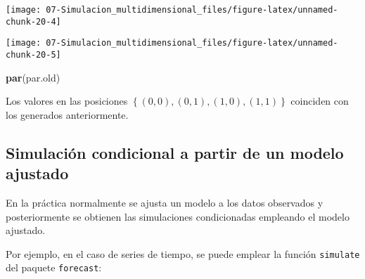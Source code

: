 \documentclass[
]{book}
\newenvironment{Shaded}{\begin{snugshade}}{\end{snugshade}}
\newcommand{\DataTypeTok}[1]{\textcolor[rgb]{0.13,0.29,0.53}{#1}}
\newcommand{\DecValTok}[1]{\textcolor[rgb]{0.00,0.00,0.81}{#1}}
\newcommand{\KeywordTok}[1]{\textcolor[rgb]{0.13,0.29,0.53}{\textbf{#1}}}
\newcommand{\NormalTok}[1]{#1}
\newcommand{\OperatorTok}[1]{\textcolor[rgb]{0.81,0.36,0.00}{\textbf{#1}}}
\newcommand{\StringTok}[1]{\textcolor[rgb]{0.31,0.60,0.02}{#1}}
\theoremstyle{break}
\theoremstyle{definition}
\theoremstyle{definition}
\theoremstyle{definition}
\theoremstyle{remark}
\begin{document}
\begin{center}\texttt{[image: 07-Simulacion\_multidimensional\_files/figure-latex/unnamed-chunk-20-4]} \end{center}

\begin{Shaded}
\end{Shaded}

\begin{center}\texttt{[image: 07-Simulacion\_multidimensional\_files/figure-latex/unnamed-chunk-20-5]} \end{center}

\begin{Shaded}
\begin{Highlighting}[]
\KeywordTok{par}\NormalTok{(par.old)}
\end{Highlighting}
\end{Shaded}

Los valores en las posiciones \(\left\{(0,0),(0,1),(1,0),(1,1)\right\}\)
coinciden con los generados anteriormente.

\hypertarget{simulaciuxf3n-condicional-a-partir-de-un-modelo-ajustado}{%
\subsection{Simulación condicional a partir de un modelo ajustado}\label{simulaciuxf3n-condicional-a-partir-de-un-modelo-ajustado}}

En la práctica normalmente se ajusta un modelo a los datos observados y
posteriormente se obtienen las simulaciones condicionadas empleando
el modelo ajustado.

Por ejemplo, en el caso de series de tiempo, se puede emplear la función \texttt{simulate}
del paquete \texttt{forecast}:
\end{document}
